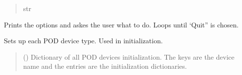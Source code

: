 \documentclass[letterpaper,10pt,english]{sphinxmanual}
\begin{document}
\begin{fulllineitems}
\begin{fulllineitems}
\begin{quote}
\begin{description}
\sphinxAtStartPar
str

\end{description}\end{quote}

\end{fulllineitems}


\begin{fulllineitems}
\label{\detokenize{Setup_PodDevices:Setup_PodDevices.Setup_PodDevices.Run}}
\pysigstartsignatures
{}
\pysigstopsignatures
\sphinxAtStartPar
Prints the options and askes the user what to do. Loops until ‘Quit” is chosen.

\end{fulllineitems}


\begin{fulllineitems}
\label{\detokenize{Setup_PodDevices:Setup_PodDevices.Setup_PodDevices.SetupPODparameters}}
\pysigstartsignatures
{}
\pysigstopsignatures
\sphinxAtStartPar
Sets up each POD device type. Used in initialization.
\begin{quote}\begin{description}
\sphinxAtStartPar
{} (\sphinxstyleliteralemphasis{\sphinxupquote{{[}}}\sphinxstyleliteralemphasis{\sphinxupquote{,}}\sphinxstyleliteralemphasis{\sphinxupquote{ | }}\sphinxstyleliteralemphasis{\sphinxupquote{{]}}}) \textendash{} Dictionary of all POD devices initialization.                 The keys are the device name and the entries are the initialization dictionaries.


\end{description}
\end{quote}
\end{fulllineitems}
\end{fulllineitems}
\end{document}
